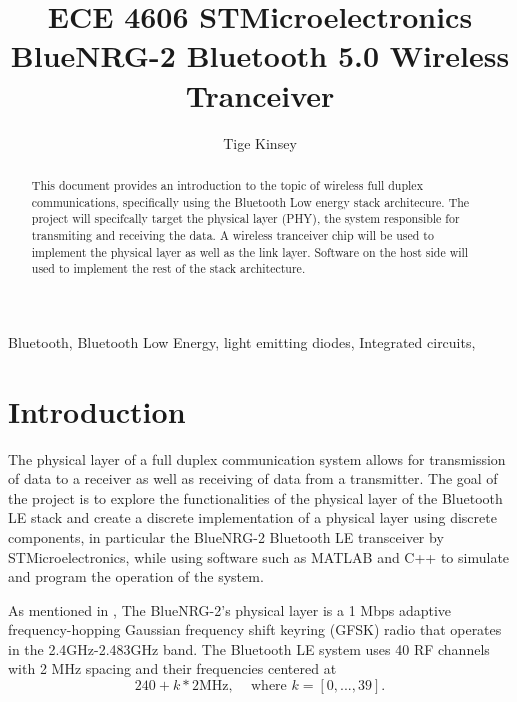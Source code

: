 \documentclass[12pt,journal,onecolumn,draftclsnofoot]{IEEEtran}
\begin{document}
\title{ECE 4606 STMicroelectronics BlueNRG-2 Bluetooth 5.0 Wireless Tranceiver }

\author{Tige Kinsey
}


\maketitle
\vspace{-18mm}

\begin{abstract}
This document provides an introduction to the topic of wireless full duplex communications, specifically using the Bluetooth Low energy stack architecure. The project will specifcally target the physical layer (PHY), the system responsible for transmiting and receiving the data. A wireless tranceiver chip will be used to implement the physical layer as well as the link layer. Software on the host side will used to implement the rest of the stack architecture.
\end{abstract}

\begin{IEEEkeywords}
Bluetooth, Bluetooth Low Energy, light emitting diodes, Integrated circuits, 
\end{IEEEkeywords}

\IEEEpeerreviewmaketitle
\newpage
\section{Introduction}
The physical layer of a full duplex communication system allows for transmission of data to a receiver as well as receiving of data from a transmitter. The goal of the project is to explore the functionalities of the physical layer of the Bluetooth LE stack and create a discrete implementation of a physical layer using discrete components, in particular the BlueNRG-2 Bluetooth LE transceiver by STMicroelectronics, while using software such as MATLAB and C++ to simulate and program the operation of the system. \par
As mentioned in \cite{an4872}, The BlueNRG-2's physical layer is a 1 Mbps adaptive frequency-hopping Gaussian frequency shift keyring (GFSK) radio that operates in the 2.4GHz-2.483GHz band. The Bluetooth LE system uses 40 RF channels with 2 MHz spacing and their frequencies centered at \[240 + k * 2\text{MHz,}\quad \text{ where }k = [0,...,39].\] \par
\end{document}
